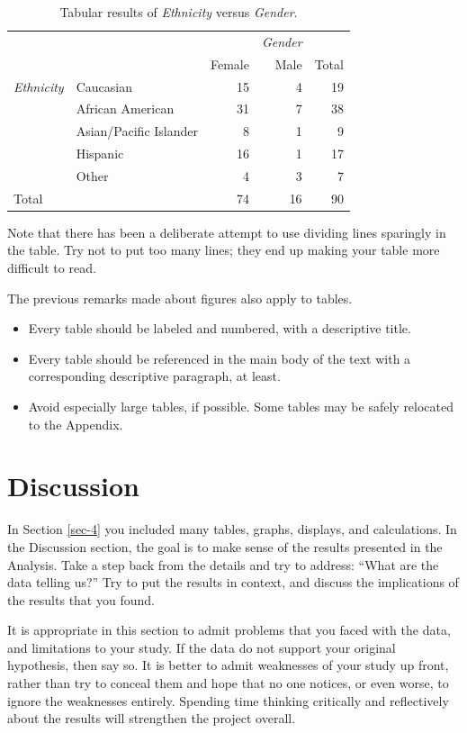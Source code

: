 \documentclass[11pt]{article}
\begin{document}
\begin{table}[htb]
\caption{\label{tab-gender}\small Tabular results of \emph{Ethnicity} versus \emph{Gender}.}
\centering
\begin{tabular}{llrrr}
 &  &  & \emph{Gender} & \\
 &  & Female & Male & Total\\
\hline
\emph{Ethnicity} & Caucasian & 15 & 4 & 19\\
 & African American & 31 & 7 & 38\\
 & Asian/Pacific Islander & 8 & 1 & 9\\
 & Hispanic & 16 & 1 & 17\\
 & Other & 4 & 3 & 7\\
\hline
Total &  & 74 & 16 & 90\\
\end{tabular}
\end{table}

Note that there has been a deliberate attempt to use dividing lines
sparingly in the table. Try not to put too many lines; they end up
making your table more difficult to read.

The previous remarks made about figures also apply to tables.
\begin{itemize}
\item Every table should be labeled and numbered, with a descriptive
title.
\item Every table should be referenced in the main body of the text with a
corresponding descriptive paragraph, at least.
\item Avoid especially large tables, if possible. Some tables may be
safely relocated to the Appendix.
\end{itemize}

\newpage

\section[Discussion]{Discussion}
\label{sec-5}

In Section \ref{sec-4} you included many tables, graphs, displays,
and calculations. In the Discussion section, the goal is to make sense
of the results presented in the Analysis. Take a step back from the
details and try to address: “What are the data telling us?” Try to put
the results in context, and discuss the implications of the results
that you found.

It is appropriate in this section to admit problems that you faced
with the data, and limitations to your study. If the data do not
support your original hypothesis, then say so. It is better to admit
weaknesses of your study up front, rather than try to conceal them and
hope that no one notices, or even worse, to ignore the weaknesses
entirely. Spending time thinking critically and reflectively about the
results will strengthen the project overall.
\end{document}
